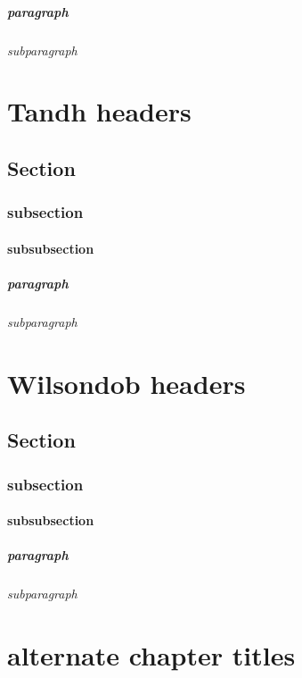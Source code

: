 \documentclass[a4paper, 12pt]{memoir}
\begin{document}
\paragraph*{paragraph} 
\subparagraph*{subparagraph} 

\chapter*{ Tandh headers } 
\section*{ Section }
\subsection*{subsection }
\subsubsection*{subsubsection} 
\paragraph*{paragraph} 
\subparagraph*{subparagraph} 

\chapter*{ Wilsondob headers } 
\section*{ Section }
\subsection*{subsection }
\subsubsection*{subsubsection} 
\paragraph*{paragraph} 
\subparagraph*{subparagraph} 





\chapter*{ alternate chapter titles }
 
\end{document}
